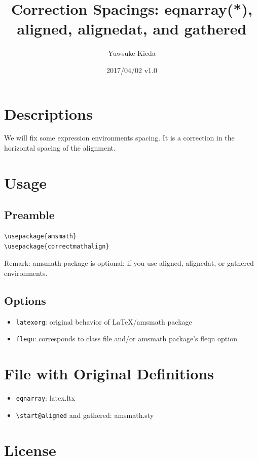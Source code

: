 \documentclass{article}
\title{Correction Spacings: eqnarray(*), aligned, alignedat, and gathered}
\author{Yuwsuke Kieda}
\date{2017/04/02 v1.0}
\begin{document}
\maketitle

\section{Descriptions}

We will fix some expression environments spacing.
It is a correction in the horizontal spacing of the alignment.

\section{Usage}

\subsection{Preamble}

\begin{verbatim}
\usepackage{amsmath}
\usepackage{correctmathalign}
\end{verbatim}

Remark: amsmath package is optional: if you use aligned, alignedat, or gathered environments.

\subsection{Options}

\begin{itemize}
 \item \verb!latexorg!: original behavior of LaTeX/amsmath package
 \item \verb!fleqn!: corresponds to class file and/or amsmath package's fleqn option
\end{itemize}

\section{File with Original Definitions}

\begin{itemize}
 \item \verb!eqnarray!: latex.ltx
 \item \verb!\start@aligned! and gathered: amsmath.sty
\end{itemize}

\section{License}
\end{document}
